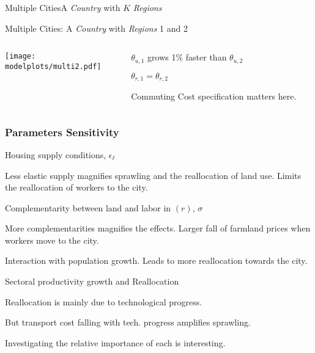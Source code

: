 \documentclass[aspectratio=169]{beamer}
\begin{document}
\begin{v75mins}
\begin{frame}{Multiple Cities}{A \emph{Country} with $K$ \emph{Regions}}
\begin{widei}
\end{widei}
\end{frame}

\begin{frame}{Multiple Cities: A \emph{Country} with \emph{Regions} 1 and 2}

\begin{columns}
\begin{column}{0.7\textwidth}
\begin{adjustbox}{center}
\texttt{[image: \\modelplots/multi2.pdf]}\end{adjustbox}
\end{column}
\begin{column}{0.3\textwidth}
\begin{midi}
\item $\theta_{u,1}$ grows 1\% faster than $\theta_{u,2}$
\item $\theta_{r,1}=\theta_{r,2}$
\item Commuting Cost specification matters here.
\end{midi}

\end{column}
\end{columns}


\end{frame}


\begin{frame}
\frametitle{Parameters Sensitivity}
\bi
\item Housing supply conditions, $\epsilon_{\ell}$
\bi\item Less elastic supply magnifies sprawling and the reallocation of land use. Limits the reallocation of workers to the city. \ei
\bigskip
\item Complementarity between land and labor in $(r)$, $\sigma$
\bi\item More complementarities magnifies the effects. Larger fall of farmland prices when workers move to the city.
\item Interaction with population growth. Leads to more reallocation towards the city.\ei
\bigskip
\item Sectoral productivity growth and Reallocation
\bi\item Reallocation is mainly due to  technological progress.
\item But transport cost falling with  tech. progress amplifies sprawling.
\item Investigating the relative importance of each is interesting.
\ei
\ei
\end{frame}\end{v75mins}
\end{document}

